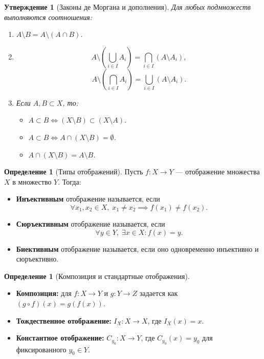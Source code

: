\documentclass[12pt,a4paper]{article}
\newtheorem{proposition}[theorem]{Утверждение}
\theoremstyle{definition}
\newtheorem{definition}[theorem]{Определение}
\begin{document}
\begin{proposition}[Законы де Моргана и дополнения]
Для любых подмножеств выполняются соотношения:
\begin{enumerate}
    \item $A \setminus B = A \setminus (A \cap B)$.
    \item
    $$A \setminus \left(\bigcup_{i \in I} A_i\right) = \bigcap_{i \in I} (A \setminus A_i),$$
    $$A \setminus \left(\bigcap_{i \in I} A_i\right) = \bigcup_{i \in I} (A \setminus A_i).$$
    \item Если $A, B \subset X$, то:
    \begin{itemize}
        \item $A \subset B \iff (X \setminus B) \subset (X \setminus A)$.
        \item $A \subset B \iff A \cap (X \setminus B) = \emptyset$.
        \item $A \cap (X \setminus B) = A \setminus B$.
    \end{itemize}
\end{enumerate}
\end{proposition}

\begin{definition}[Типы отображений]
Пусть $f: X \to Y$ --- отображение множества $X$ в множество $Y$.
Тогда:
\begin{itemize}
    \item \textbf{Инъективным} отображение называется, если
    $$\forall x_1, x_2 \in X,\; x_1 \neq x_2 \implies f(x_1) \neq f(x_2).$$
    \item \textbf{Сюръективным} отображение называется, если
    $$\forall y \in Y,\; \exists x \in X : f(x) = y.$$
    \item \textbf{Биективным} отображение называется, если оно одновременно инъективно и сюръективно.
\end{itemize}
\end{definition}

\begin{definition}[Композиция и стандартные отображения]
\begin{itemize}
    \item \textbf{Композиция:} для $f: X \to Y$ и $g: Y \to Z$ задается как $(g \circ f)(x) = g(f(x))$.
    \item \textbf{Тождественное отображение:} $I_X: X \to X$, где $I_X(x) = x$.
    \item \textbf{Константное отображение:} $C_{y_0}: X \to Y$, где $C_{y_0}(x) = y_0$ для фиксированного $y_0 \in Y$.
\end{itemize}
\end{definition}
\end{document}
